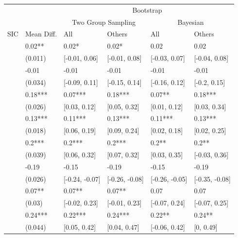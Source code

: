 \documentclass[
  12pt]{article}
\theoremstyle{definition}
\theoremstyle{remark}
\begin{document}
\begin{table}
{\centering
\begin{tabular}[t]{r|l|l|l|l|l}
\hline
\multicolumn{2}{c|}{ } & \multicolumn{4}{c}{Bootstrap} \\
\cline{3-6}
\multicolumn{2}{c|}{ } & \multicolumn{2}{c|}{Two Group Sampling} & \multicolumn{2}{c}{Bayesian} \\
\cline{3-4} \cline{5-6}
SIC & Mean Diff. & All & Others & All  & Others \\
\hline
 & 0.02** & 0.02* & 0.02* & 0.02 & 0.02\\
\cline{2-6}
\multirow[t]{-2}{*}{\raggedleft\arraybackslash 311} & (0.011) & [-0.01, 0.06] & [-0.01, 0.08] & [-0.03, 0.07] & [-0.04, 0.08]\\
\cline{1-6}
 & -0.01 & -0.01 & -0.01 & -0.01 & -0.01\\
\cline{2-6}
\multirow[t]{-2}{*}{\raggedleft\arraybackslash 312} & (0.034) & [-0.09, 0.11] & [-0.15, 0.14] & [-0.16, 0.12] & [-0.2, 0.15]\\
\cline{1-6}
 & 0.18*** & 0.07*** & 0.18*** & 0.07** & 0.18***\\
\cline{2-6}
\multirow[t]{-2}{*}{\raggedleft\arraybackslash 313} & (0.026) & [0.03, 0.12] & [0.05, 0.32] & [0.01, 0.12] & [0.03, 0.34]\\
\cline{1-6}
 & 0.13*** & 0.11*** & 0.13*** & 0.11*** & 0.13***\\
\cline{2-6}
\multirow[t]{-2}{*}{\raggedleft\arraybackslash 321} & (0.018) & [0.06, 0.19] & [0.09, 0.24] & [0.02, 0.18] & [0.02, 0.25]\\
\cline{1-6}
 & 0.2*** & 0.2*** & 0.2*** & 0.2** & 0.2**\\
\cline{2-6}
\multirow[t]{-2}{*}{\raggedleft\arraybackslash 322} & (0.039) & [0.06, 0.32] & [0.07, 0.32] & [0.03, 0.35] & [-0.03, 0.36]\\
\cline{1-6}
 & -0.19 & -0.15 & -0.19 & -0.15 & -0.19\\
\cline{2-6}
\multirow[t]{-2}{*}{\raggedleft\arraybackslash 323} & (0.026) & [-0.24, -0.07] & [-0.26, -0.08] & [-0.26, -0.05] & [-0.35, -0.08]\\
\cline{1-6}
 & 0.07** & 0.07** & 0.07** & 0.07 & 0.07\\
\cline{2-6}
\multirow[t]{-2}{*}{\raggedleft\arraybackslash 324} & (0.03) & [-0.02, 0.23] & [-0.01, 0.23] & [-0.07, 0.24] & [-0.07, 0.25]\\
\cline{1-6}
 & 0.24*** & 0.22*** & 0.24*** & 0.22** & 0.24**\\
\cline{2-6}
\multirow[t]{-2}{*}{\raggedleft\arraybackslash 331} & (0.044) & [0.05, 0.42] & [0.04, 0.47] & [-0.06, 0.42] & [0, 0.49]\\

\end{tabular}}
\end{table}
\end{document}
